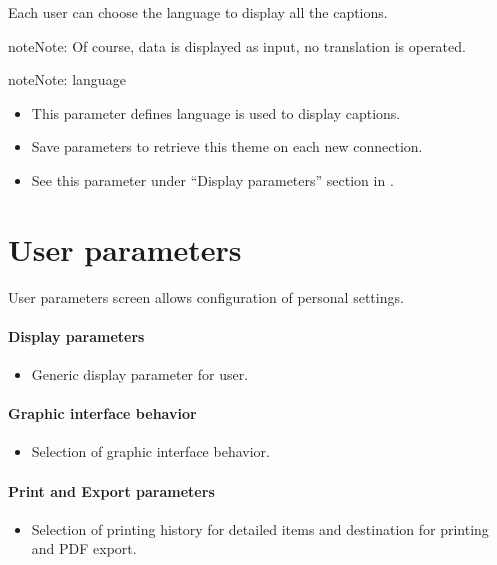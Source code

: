 \documentclass[letterpaper,10pt,english]{sphinxmanual}
\begin{document}
Each user can choose the language to display all the captions.

\begin{notice}{note}{Note:}
Of course, data is displayed as input, no translation is operated.
\end{notice}

\begin{notice}{note}{Note:}
language
\begin{itemize}
\item {} 
This parameter defines language is used to display captions.

\item {} 
Save parameters to retrieve this theme on each new connection.

\item {} 
See this parameter under ``Display parameters'' section in {\hyperref[UserParameter:user-parameters-label]{\emph{}}}.

\end{itemize}
\end{notice}
\newpage
{}

\section{User parameters}
\label{UserParameter:user-parameters}\label{UserParameter:user-parameters-label}\label{UserParameter:index-0}\label{UserParameter::doc}
User parameters screen allows configuration of personal settings.
\paragraph{Display parameters}
\begin{itemize}
\item {} 
Generic display parameter for user.

\end{itemize}
\paragraph{Graphic interface behavior}
\begin{itemize}
\item {} 
Selection of graphic interface behavior.

\end{itemize}
\paragraph{Print and Export parameters}
\begin{itemize}
\item {} 
Selection of printing history for detailed items and destination for printing and PDF export.

\end{itemize}
\end{document}
